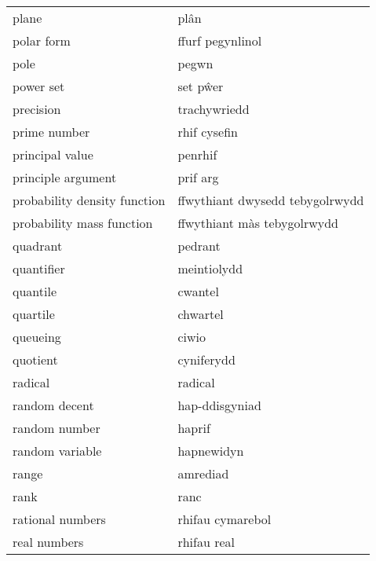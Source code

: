 \begin{supertabular}{p{0.22\textwidth}p{0.22\textwidth}}
                           plane &                            plân \\
                      polar form &                ffurf pegynlinol \\
                            pole &                           pegwn \\
                       power set &                        set pŵer \\
                       precision &                    trachywriedd \\
                    prime number &                    rhif cysefin \\
                 principal value &                         penrhif \\
              principle argument &                        prif arg \\
    probability density function & ffwythiant dwysedd tebygolrwydd \\
       probability mass function &     ffwythiant màs tebygolrwydd \\
                        quadrant &                         pedrant \\
                      quantifier &                     meintiolydd \\
                        quantile &                         cwantel \\
                        quartile &                        chwartel \\
                        queueing &                           ciwio \\
                        quotient &                      cyniferydd \\
                         radical &                         radical \\
                   random decent &                  hap-ddisgyniad \\
                   random number &                          haprif \\
                 random variable &                      hapnewidyn \\
                           range &                        amrediad \\
                            rank &                            ranc \\
                rational numbers &                rhifau cymarebol \\
                    real numbers &                     rhifau real \\

\end{supertabular}
